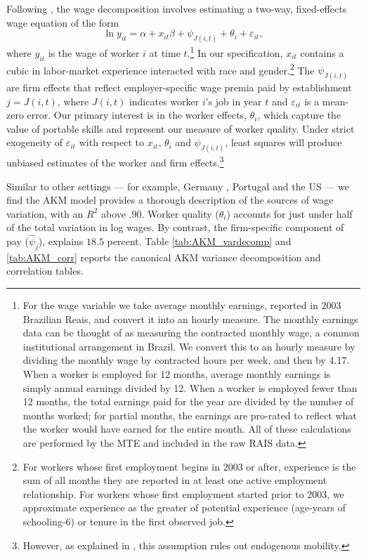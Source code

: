 
Following \citet{Abowd1999}, the wage decomposition involves estimating a two-way, fixed-effects wage equation of the form
%
	\begin{equation}
	\label{eq:AKM_full}
	\ln y_{it} = \alpha + x_{it}\beta + \psi_{J(i,t)} + \theta_i 
	         + \varepsilon_{it},
	\end{equation}
where $y_{it}$ is the wage of worker $i$ at time $t$.\footnote{For the wage variable we take average monthly earnings, reported in 2003 Brazilian Reais, and convert it into an hourly measure. The monthly earnings data can be thought of as measuring the contracted monthly wage, a common institutional arrangement in Brazil. We convert this to an hourly measure by dividing the monthly wage by contracted hours per week, and then by 4.17. When a worker is employed for 12 months, average monthly earnings is simply annual earnings divided by 12. When a worker is employed fewer than 12 months, the total earnings paid for the year are divided by the number of months worked; for partial months, the earnings are pro-rated to reflect what the worker would have earned for the entire month. All of these calculations are performed by the MTE and included in the raw RAIS data.} In our specification, $x_{it}$ contains a cubic in labor-market experience interacted with race and gender.\footnote{For workers whose first employment begins in 2003 or after, experience is the sum of all months they are reported in at least one active employment relationship. For workers whose first employment started prior to 2003, we approximate experience as the greater of potential experience (age-years of schooling-6) or tenure in the first observed job.}   The $\psi_{J(i,t)}$ are firm effects that reflect employer-specific wage premia paid by establishment $j=J(i,t)$, where $J(i,t)$ indicates worker $i$'s job in year $t$ and $\varepsilon_{it}$ is a mean-zero error. Our primary interest is in the worker effects, $\theta_i$, which capture the value of portable skills and represent our measure of worker quality. Under strict exogeneity of $\varepsilon_{it}$ with respect to $x_{it}$, $\theta_i$ and $\psi_{J(i,t)}$, least squares will produce unbiased estimates of the worker and firm effects.\footnote{However, as explained in \citet{Abowd1999}, this assumption rules out endogenous mobility.} 

Similar to other settings --- for example, Germany \citep{Card2013}, Portugal \citep{Card:Bargaining:QJE:2016} and the US \citep{Abowd:EndMob:CES:2015} --- we find the AKM model provides a  thorough description of the sources of wage variation, with an $R^2$ above .90. Worker quality ($\hat\theta_i$) accounts for just under half of the total variation in log wages.  By contrast, the firm-specific component of pay ($\hat\psi_j$), explains $18.5$ percent. Table \ref{tab:AKM_vardecomp} and \ref{tab:AKM_corr} reports the canonical AKM variance decomposition and correlation tables.
 